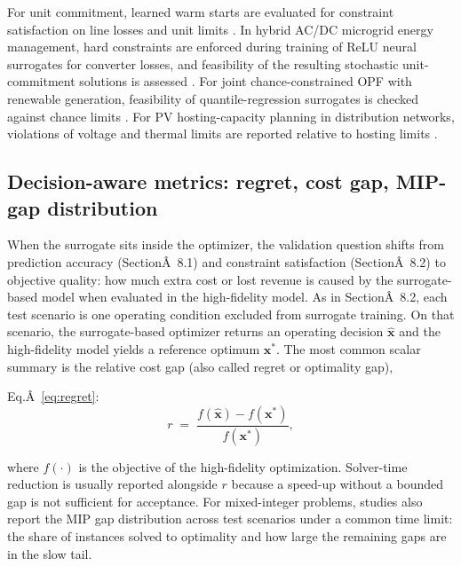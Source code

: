 For unit commitment, learned warm starts are evaluated for constraint
satisfaction on line losses and unit limits \cite{Chen2022}. In hybrid AC/DC
microgrid energy management, hard constraints are enforced during
training of ReLU neural surrogates for converter losses, and feasibility
of the resulting stochastic unit- commitment solutions is assessed
\cite{Liu20242534}. For joint chance-constrained OPF with renewable
generation, feasibility of quantile-regression surrogates is checked
against chance limits \cite{Chen2023657}. For PV hosting-capacity planning
in distribution networks, violations of voltage and thermal limits are
reported relative to hosting limits \cite{Koirala20242284}.

\subsection{Decision-aware metrics: regret, cost gap, MIP-gap distribution}
\label{sec:val:decision}

When the surrogate sits inside the optimizer, the validation question
shifts from prediction accuracy
(SectionÂ~8.1) and constraint satisfaction
(SectionÂ~8.2) to objective quality: how much extra
cost or lost revenue is caused by the surrogate-based model when
evaluated in the high-fidelity model. As in
SectionÂ~8.2, each test scenario is one operating
condition excluded from surrogate training. On that scenario, the
surrogate-based optimizer returns an operating decision
$\hat{\mathbf{x}}$ and the high-fidelity model yields a reference
optimum $\mathbf{x}^{*}$. The most common scalar summary is the relative
cost gap (also called regret or optimality gap),

Eq.Â~\eqref{eq:regret}: $$\begin{equation}
  r \;=\; \frac{f(\hat{\mathbf{x}}) - f(\mathbf{x}^{*})}{f(\mathbf{x}^{*})},
  \label{eq:regret}
\end{equation}$$

where $f(\cdot)$ is the objective of the high-fidelity optimization.
Solver-time reduction is usually reported alongside $r$ because a
speed-up without a bounded gap is not sufficient for acceptance. For
mixed-integer problems, studies also report the MIP gap distribution
across test scenarios under a common time limit: the share of instances
solved to optimality and how large the remaining gaps are in the slow
tail.

